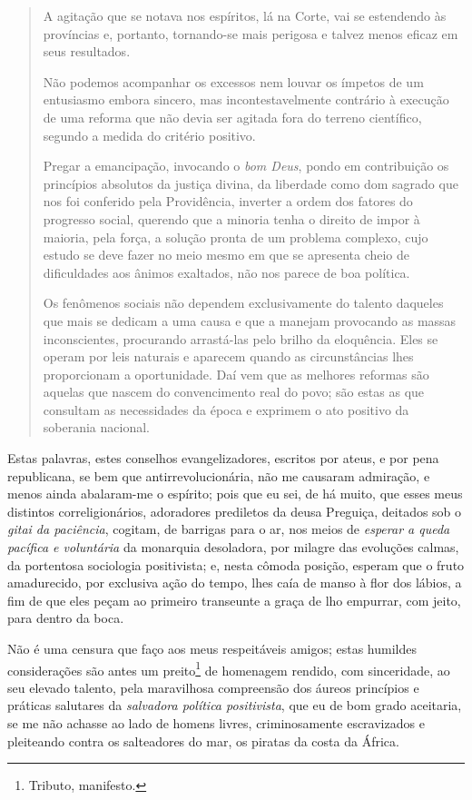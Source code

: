 {\begin{quote}
A agitação que se notava nos espíritos, lá na Corte, vai se estendendo
às províncias e, portanto, tornando-se mais perigosa e talvez menos
eficaz em seus resultados.

Não podemos acompanhar os excessos nem louvar os ímpetos de um
entusiasmo embora sincero, mas incontestavelmente contrário à execução
de uma reforma que não devia ser agitada fora do terreno científico,
segundo a medida do critério positivo.

Pregar a emancipação, invocando o \emph{bom Deus}, pondo em contribuição
os princípios absolutos da justiça divina, da liberdade como dom sagrado
que nos foi conferido pela Providência, inverter a ordem dos fatores do
progresso social, querendo que a minoria tenha o direito de impor à
maioria, pela força, a solução pronta de um problema complexo, cujo
estudo se deve fazer no meio mesmo em que se apresenta cheio de
dificuldades aos ânimos exaltados, não nos parece de boa política.

Os fenômenos sociais não dependem exclusivamente do talento daqueles que
mais se dedicam a uma causa e que a manejam provocando as massas
inconscientes, procurando arrastá-las pelo brilho da eloquência. Eles se
operam por leis naturais e aparecem quando as circunstâncias lhes
proporcionam a oportunidade. Daí vem que as melhores reformas são
aquelas que nascem do convencimento real do povo; são estas as que
consultam as necessidades da época e exprimem o ato positivo da
soberania nacional.
\end{quote}

\noindent\dotfill{}

Estas palavras, estes conselhos evangelizadores, escritos por ateus, e
por pena republicana, se bem que antirrevolucionária, não me causaram
admiração, e menos ainda abalaram-me o espírito; pois que eu sei, de há
muito, que esses meus distintos correligionários, adoradores prediletos
da deusa Preguiça, deitados sob o \emph{gitai da paciência}, cogitam, de
barrigas para o ar, nos meios de \emph{esperar a queda pacífica e
voluntária} da monarquia desoladora, por milagre das evoluções calmas,
da portentosa sociologia positivista; e, nesta cômoda posição, esperam
que o fruto amadurecido, por exclusiva ação do tempo, lhes caía de manso
à flor dos lábios, a fim de que eles peçam ao primeiro transeunte a
graça de lho empurrar, com jeito, para dentro da boca.

Não é uma censura que faço aos meus respeitáveis amigos; estas humildes
considerações são antes um preito\footnote{Tributo, manifesto.} de
homenagem rendido, com sinceridade, ao seu elevado talento, pela
maravilhosa compreensão dos áureos princípios e práticas salutares da
\emph{salvadora política positivista}, que eu de bom grado aceitaria, se
me não achasse ao lado de homens livres, criminosamente escravizados e
pleiteando contra os salteadores do mar, os piratas da costa da África.

}
